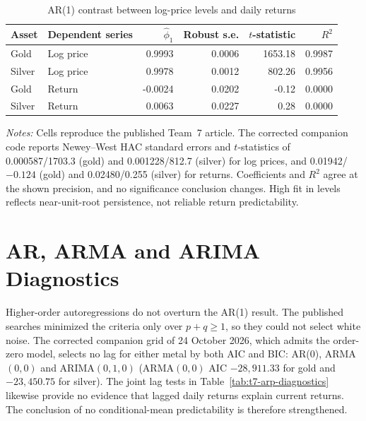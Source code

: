 \begin{table}[htbp]
\centering
\caption{AR(1) contrast between log-price levels and daily returns}
\label{tab:t7-ar1-level-return}
\small
\begin{tabular}{llrrrr}
\toprule
Asset & Dependent series & $\hat\phi_1$ & Robust s.e. & $t$-statistic & $R^2$ \\
\midrule
Gold   & Log price & 0.9993  & 0.0006 & 1653.18 & 0.9987 \\
Silver & Log price & 0.9978  & 0.0012 &  802.26 & 0.9956 \\
Gold   & Return    &-0.0024  & 0.0202 &   -0.12 & 0.0000 \\
Silver & Return    & 0.0063  & 0.0227 &    0.28 & 0.0000 \\
\bottomrule
\end{tabular}
\begin{minipage}{0.90\textwidth}
\footnotesize\emph{Notes:} Cells reproduce the published Team~7 article.
The corrected companion code reports Newey--West HAC standard errors and
$t$-statistics of 0.000587/1703.3 (gold) and 0.001228/812.7 (silver) for
log prices, and 0.01942/$-0.124$ (gold) and 0.02480/0.255 (silver) for
returns. Coefficients and $R^2$ agree at the shown precision, and no
significance conclusion changes. High fit in levels reflects near-unit-root
persistence, not reliable return predictability.
\end{minipage}
\end{table}

\section{AR, ARMA and ARIMA Diagnostics}

Higher-order autoregressions do not overturn the AR(1) result. The published
searches minimized the criteria only over $p+q\geq 1$, so they could not
select white noise. The corrected companion grid of 24 October 2026, which
admits the order-zero model, selects no lag for either metal by both AIC
and BIC: AR(0), ARMA$(0,0)$ and ARIMA$(0,1,0)$ (ARMA$(0,0)$ AIC
$-28{,}911.33$ for gold and $-23{,}450.75$ for silver). The joint lag tests in Table~\ref{tab:t7-arp-diagnostics} likewise provide
no evidence that lagged daily returns explain current returns. The conclusion of
no conditional-mean predictability is therefore strengthened.

